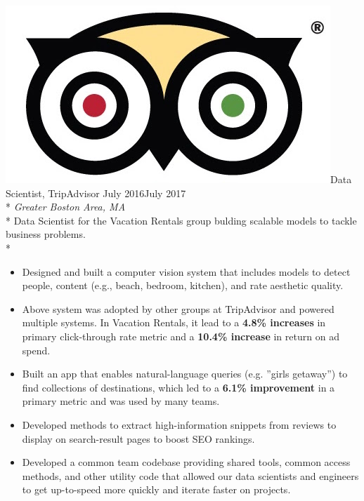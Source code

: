 \documentclass[print]{friggeri-cv} %
\newcommand{\tripicon}{\includegraphics[scale=0.05]{trip_logo.jpg}}%
\begin{document}
\begin{description} \itemsep1pt \parskip0pt 
  \item \tripicon {\largeheaderfont Data Scientist, TripAdvisor } \hfill
    {\smallheaderfont July 2016\textemdash July 2017}\\*
    {\footnotesize \emph{Greater Boston Area, MA}} \\*
    Data Scientist for the Vacation Rentals group bulding scalable models to tackle business problems.\\*
    \begin{itemize} \itemsep0.5pt \parskip0pt 
      \item Designed and built a computer vision system that includes models to
      detect people, content (e.g., beach, bedroom, kitchen), and rate aesthetic
      quality.

      \item Above system was adopted by other groups at TripAdvisor and powered multiple
      systems. In Vacation Rentals, it lead to a \textbf{4.8\% increases} in primary
      click-through rate metric and a \textbf{10.4\% increase} in return on ad spend.

      \item Built an app that enables natural-language queries (e.g. ”girls getaway”)
      to find collections of destinations, which led to a \textbf{6.1\% improvement} in a
      primary metric and was used by many teams. 

      \item Developed methods to extract high-information snippets from reviews
      to display on search-result pages to boost SEO rankings.

      \item Developed a common team codebase providing shared tools, common
      access methods, and other utility code that allowed our data scientists
      and engineers to get up-to-speed more quickly and iterate faster on
      projects.
    \end{itemize}
  \end{description}
\end{document}
